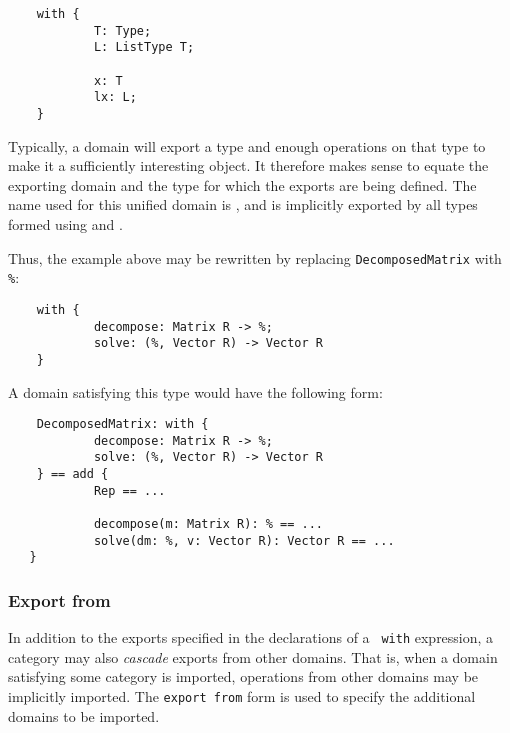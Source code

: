 {\begin{small}
\begin{verbatim}
    with {
            T: Type;
            L: ListType T;

            x: T
            lx: L;
    }
\end{verbatim}
\end{small}
        
Typically, a domain will export a type and enough operations on that
type to make it a sufficiently interesting object. 
It therefore makes sense to equate the exporting domain and
the type for which the exports are being defined. The name used for
this unified domain is \ttin{\%}, and is implicitly exported by all
types formed using  and .

Thus, the  example above may be rewritten by
replacing {\tt DecomposedMatrix} with {\tt \%}:

\begin{small}
\begin{verbatim}
    with {
            decompose: Matrix R -> %;
            solve: (%, Vector R) -> Vector R
    }
\end{verbatim}
\end{small}

A domain satisfying this type would have the following form:

\begin{small}
\begin{verbatim}
    DecomposedMatrix: with {
            decompose: Matrix R -> %;
            solve: (%, Vector R) -> Vector R
    } == add {
            Rep == ...

            decompose(m: Matrix R): % == ...
            solve(dm: %, v: Vector R): Vector R == ...
   }
\end{verbatim}
\end{small}%
\goodbreak
\subsubsection{Export from}
\label{asugLangTypesExports}

In addition to the exports specified in the declarations of a {\tt
with} expression, a category may also {\em cascade\/} exports from other
domains. That is, when a domain satisfying some category is imported,
operations from other domains may be implicitly imported.
The {\tt export from} form is used to specify the additional domains to
be imported.

}
